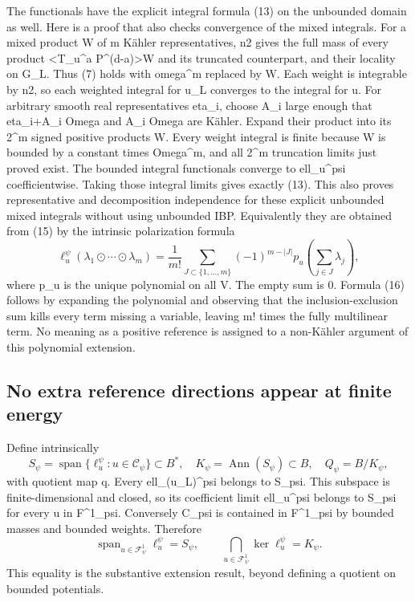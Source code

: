 \documentclass[
]{article}
\begin{document}
The functionals have the explicit integral formula (13) on the unbounded
domain as well. Here is a proof that also checks convergence of the
mixed integrals. For a mixed product W of m Kähler representatives, n2
gives the full mass of every product \textless T\_u\^{}a
P\^{}(d-a)\textgreater W and its truncated counterpart, and their
locality on G\_L. Thus (7) holds with omega\^{}m replaced by W. Each
weight is integrable by n2, so each weighted integral for u\_L converges
to the integral for u. For arbitrary smooth real representatives eta\_i,
choose A\_i large enough that eta\_i+A\_i Omega and A\_i Omega are
Kähler. Expand their product into its 2\^{}m signed positive products W.
Every weight integral is finite because W is bounded by a constant times
Omega\^{}m, and all 2\^{}m truncation limits just proved exist. The
bounded integral functionals converge to ell\_u\^{}psi coefficientwise.
Taking those integral limits gives exactly (13). This also proves
representative and decomposition independence for these explicit
unbounded mixed integrals without using unbounded IBP. Equivalently they
are obtained from (15) by the intrinsic polarization formula \[
\ell_u^\psi(\lambda_1\odot\cdots\odot\lambda_m)
=\frac1{m!}\sum_{J\subset\{1,\ldots,m\}}(-1)^{m-|J|}
p_u\!\left(\sum_{j\in J}\lambda_j\right),\tag{16}
\] where p\_u is the unique polynomial on all V. The empty sum is 0.
Formula (16) follows by expanding the polynomial and observing that the
inclusion-exclusion sum kills every term missing a variable, leaving m!
times the fully multilinear term. No meaning as a positive reference is
assigned to a non-Kähler argument of this polynomial extension.

\subsection{No extra reference directions appear at finite
energy}\label{no-extra-reference-directions-appear-at-finite-energy}

Define intrinsically \[
S_\psi=\operatorname{span}\{\ell_u^\psi:u\in\mathcal C_\psi\}\subset B^*,
\quad K_\psi=\operatorname{Ann}(S_\psi)\subset B,
\quad Q_\psi=B/K_\psi,
\] with quotient map q. Every ell\_(u\_L)\^{}psi belongs to S\_psi. This
subspace is finite-dimensional and closed, so its coefficient limit
ell\_u\^{}psi belongs to S\_psi for every u in F\^{}1\_psi. Conversely
C\_psi is contained in F\^{}1\_psi by bounded masses and bounded
weights. Therefore \[
\operatorname{span}_{u\in\mathcal F^1_\psi}\ell_u^\psi=S_\psi,
\qquad
\bigcap_{u\in\mathcal F^1_\psi}\ker\ell_u^\psi=K_\psi.\tag{17}
\] This equality is the substantive extension result, beyond defining a
quotient on bounded potentials.
\end{document}
